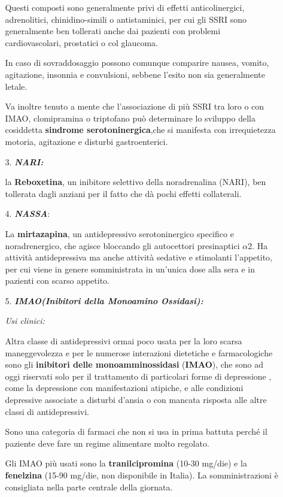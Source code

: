 \begin{itemize}
\begin{itemize}
Questi composti sono generalmente privi di effetti anticolinergici,
adrenolitici, chinidino-simili o antistaminici, per cui gli SSRI sono
generalmente ben tollerati anche dai pazienti con problemi
cardiovascolari, prostatici o col glaucoma.

In caso di sovraddosaggio possono comunque comparire nausea, vomito,
agitazione, insonnia e convulsioni, sebbene l'esito non sia generalmente
letale.

Va inoltre tenuto a mente che l'associazione di più SSRI tra loro o con
IMAO, clomipramina o triptofano può determinare lo sviluppo della
cosiddetta \textbf{sindrome serotoninergica},che si manifesta con
irrequietezza motoria, agitazione e disturbi gastroenterici.

\item[3.] \textbf{\emph{NARI:}}

la \textbf{Reboxetina}, un inibitore selettivo della noradrenalina
(NARI), ben tollerata dagli anziani per il fatto che dà pochi effetti
collaterali.

\item[4.] \textbf{\emph{NASSA}}:

La \textbf{mirtazapina}, un antidepressivo serotoninergico specifico e
noradrenergico, che agisce bloccando gli autocettori presinaptici $\alpha$2. Ha
attività antidepressiva ma anche attività sedative e stimolanti
l'appetito, per cui viene in genere somministrata in un'unica dose alla
sera e in pazienti con scarso appetito.

\item[5.] \textbf{\emph{IMAO(Inibitori della Monoamino Ossidasi):}}

\emph{\emph{Usi clinici:}}

Altra classe di antidepressivi ormai poco usata per la loro scarsa
maneggevolezza e per le numerose interazioni dietetiche e farmacologiche
sono gli \textbf{inibitori delle monoamminossidasi} (\textbf{IMAO}), che
sono ad oggi riservati solo per il trattamento di particolari forme di
depressione , come la depressione con manifestazioni atipiche, e alle
condizioni depressive associate a disturbi d'ansia o con mancata
risposta alle altre classi di antidepressivi.

Sono una categoria di farmaci che non si usa in prima battuta perché il
paziente deve fare un regime alimentare molto regolato.

Gli IMAO più usati sono la \textbf{tranilcipromina} (10-30 mg/die) e la
\textbf{fenelzina} (15-90 mg/die, non disponibile in Italia). La
somministrazioni è consigliata nella parte centrale della giornata.


\end{itemize}
\end{itemize}
